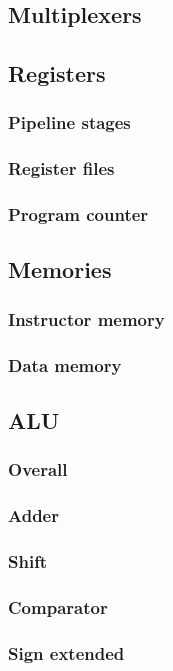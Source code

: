 \documentclass[11pt, a4paper, twoside]{IEEEtran}
\begin{document}
\subsection{Multiplexers}
\subsection{Registers}
\subsubsection{Pipeline stages}
\subsubsection{Register files}
\subsubsection{Program counter}
\subsection{Memories}
\subsubsection{Instructor memory}
\subsubsection{Data memory}
\subsection{ALU}
\subsubsection{Overall}
\subsubsection{Adder}
\subsubsection{Shift}
\subsubsection{Comparator}
\subsubsection{Sign extended}
\end{document}
